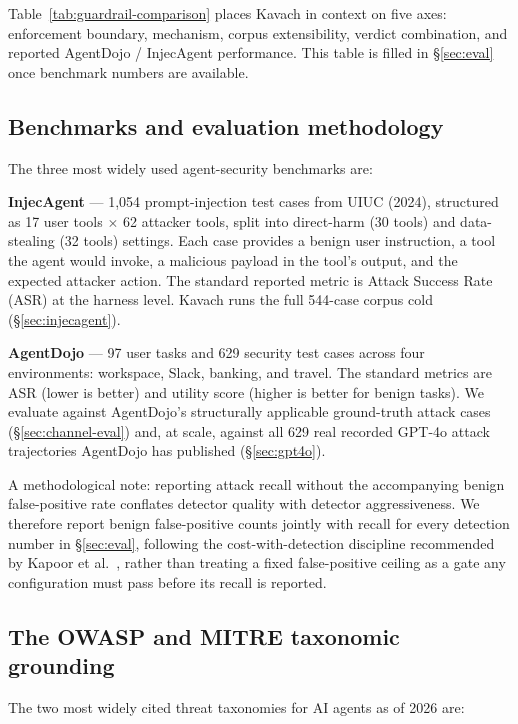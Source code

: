\documentclass[sigconf,anonymous,review]{acmart}
\begin{document}
Table~\ref{tab:guardrail-comparison} places Kavach in context on five axes:
enforcement boundary, mechanism, corpus extensibility, verdict combination, and
reported AgentDojo / InjecAgent performance. This table is filled in
\S\ref{sec:eval} once benchmark numbers are available.

\subsection{Benchmarks and evaluation methodology}

The three most widely used agent-security benchmarks are:

\textbf{InjecAgent} \cite{zhan2024injecagent} — 1,054 prompt-injection test
cases from UIUC (2024), structured as 17 user tools $\times$ 62 attacker tools,
split into direct-harm (30 tools) and data-stealing (32 tools) settings. Each
case provides a benign user instruction, a tool the agent would invoke, a
malicious payload in the tool's output, and the expected attacker action. The
standard reported metric is Attack Success Rate (ASR) at the harness level.
Kavach runs the full 544-case corpus cold (\S\ref{sec:injecagent}).

\textbf{AgentDojo} \cite{debenedetti2024agentdojo} — 97 user tasks and 629
security test cases across four environments: workspace, Slack, banking, and
travel. The standard metrics are ASR (lower is better) and utility score (higher
is better for benign tasks). We evaluate against AgentDojo's structurally
applicable ground-truth attack cases (\S\ref{sec:channel-eval}) and, at
scale, against all 629 real recorded GPT-4o attack trajectories AgentDojo has
published (\S\ref{sec:gpt4o}).

A methodological note: reporting attack recall without the accompanying benign
false-positive rate conflates detector quality with detector aggressiveness. We
therefore report benign false-positive counts jointly with recall for every
detection number in \S\ref{sec:eval}, following the cost-with-detection
discipline recommended by Kapoor et al.~\cite{kapoor2024aiagents}, rather than
treating a fixed false-positive ceiling as a gate any configuration must pass
before its recall is reported.

\subsection{The OWASP and MITRE taxonomic grounding}

The two most widely cited threat taxonomies for AI agents as of 2026 are:
\end{document}
